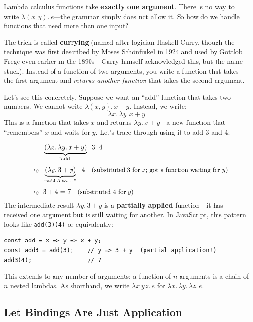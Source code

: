 \documentclass[11pt,a4paper]{article}
\theoremstyle{definition}
\newcommand{\lam}{\lambda}
\newcommand{\reduce}{\longrightarrow_\beta}
\newcommand{\rmark}[1]{\quad\text{\small(#1)}}
\begin{document}
Lambda calculus functions take \textbf{exactly one argument}. There is no way to
write $\lam(x, y).\, e$---the grammar simply does not allow it. So how do we
handle functions that need more than one input?

The trick is called \textbf{currying} (named after logician Haskell Curry,
though the technique was first described by Moses Sch\"onfinkel in 1924 and
used by Gottlob Frege even earlier in the 1890s---Curry himself acknowledged
this, but the name stuck). Instead of a function of
two arguments, you write a function that takes the first argument and
\emph{returns another function} that takes the second argument.

Let's see this concretely. Suppose we want an ``add'' function that takes two
numbers. We cannot write $\lam(x, y).\, x + y$. Instead, we write:
\[
  \lam x.\, \lam y.\, x + y
\]
This is a function that takes $x$ and returns $\lam y.\, x + y$---a new
function that ``remembers'' $x$ and waits for $y$. Let's trace through using it
to add 3 and 4:

\begin{workedexample}
\begin{align*}
  & \underbrace{(\lam x.\, \lam y.\, x + y)}_{\text{``add''}} \;\; 3 \;\; 4 \\[4pt]
  \reduce\;\; & \underbrace{(\lam y.\, 3 + y)}_{\text{``add 3 to\ldots''}} \;\; 4
    \rmark{substituted 3 for $x$; got a function waiting for $y$} \\[4pt]
  \reduce\;\; & 3 + 4 = 7
    \rmark{substituted 4 for $y$}
\end{align*}
The intermediate result $\lam y.\, 3 + y$ is a \textbf{partially applied}
function---it has received one argument but is still waiting for another. In
JavaScript, this pattern looks like \texttt{add(3)(4)} or equivalently:
\begin{verbatim}
const add = x => y => x + y;
const add3 = add(3);    // y => 3 + y  (partial application!)
add3(4);                // 7
\end{verbatim}
\end{workedexample}

This extends to any number of arguments: a function of $n$ arguments is a chain
of $n$ nested lambdas. As shorthand, we write $\lam x\, y\, z.\, e$ for
$\lam x.\, \lam y.\, \lam z.\, e$.

\subsection{Let Bindings Are Just Application}\label{sec:let}
\end{document}
